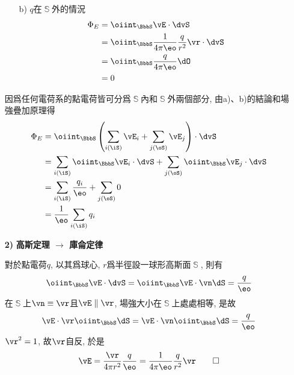 \begin{solve}
\begin{itemize}
\begin{multicols}{2}
\begin{itemize}
                      \item[b)] $q$在$\BbbS$外的情況
                            \begin{align*}
                                \Phi_E & = \oiint_{\BbbS} \vE \cdot \dvS                                 \\
                                       & = \oiint_{\BbbS} \frac{1}{4\pi\eo} \frac{q}{r^2} \vr \cdot \dvS \\
                                       & = \oiint_{\BbbS} \frac{q}{4\pi\eo} \dO                          \\
                                       & = 0
                            \end{align*}
                  \end{itemize}
              \end{multicols}

              因爲任何電荷系的點電荷皆可分爲$\BbbS$內和$\BbbS$外兩個部分, 由a)、b)的結論和場強疊加原理得
              \begin{align*}
                  \Phi_E & = \oiint_{\BbbS}\left(\sum_{i(\iS)}\vE_i + \sum_{j(\oS)}\vE_j\right)\cdot \dvS            \\
                         & = \sum_{i(\iS)}\oiint_{\BbbS}\vE_i\cdot \dvS + \sum_{j(\oS)}\oiint_{\BbbS}\vE_j\cdot \dvS \\
                         & = \sum_{i(\iS)}\frac{q_i}{\eo} + \sum_{j(\oS)} 0                                          \\
                         & = \frac{1}{\eo}\sum_{i(\iS)} q_i                                                          \\
              \end{align*}


        \item[\textbf{2)}] \textbf{高斯定理 $\rightarrow$ 庫侖定律}

              對於點電荷$q$, 以其爲球心, $r$爲半徑設一球形高斯面$\BbbS$, 則有
              $$\oiint_{\BbbS} \vE \cdot \dvS = \oiint_{\BbbS} \vE \cdot \vn \dS = \frac{q}{\eo}$$
              在$\BbbS$上$\vn \equiv \vr$且$\vE \parallel \vr$, 場強大小在$\BbbS$上處處相等, 是故
              $$\vE \cdot \vr \oiint_{\BbbS} \dS = \vE \cdot \vn \oiint_{\BbbS} \dS = \frac{q}{\eo}$$
              $\vr^2 = 1$, 故$\vr$自反, 於是
              \begin{equation*}
                  \vE = \frac{\vr}{4\pi r^2}\frac{q}{\eo} = \frac{1}{4\pi\eo}\frac{q}{r^2}\vr \qedhere
              \end{equation*}
    \end{itemize}
\end{solve}